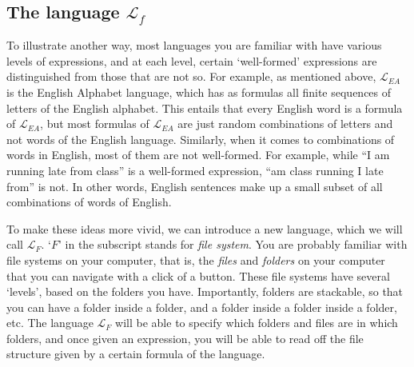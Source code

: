 \subsection{The language $\mathcal{L}_f$}

To illustrate another way, most languages you are familiar with have various levels of expressions, and at each level, certain `well-formed' expressions are distinguished from those that are not so. For example, as mentioned above, $\mathcal{L}_{EA}$ is the English Alphabet language, which has as formulas all finite sequences of letters of the English alphabet. This entails that every English word is a formula of $\mathcal{L}_{EA}$, but most formulas of $\mathcal{L}_{EA}$ are just random combinations of letters and not words of the English language. Similarly, when it comes to combinations of words in English, most of them are not well-formed. For example, while ``I am running late from class'' is a well-formed expression, ``am class running I late from'' is not. In other words, English sentences make up a small subset of all combinations of words of English. 

To make these ideas more vivid, we can introduce a new language, which we will call $\mathcal{L}_F$. `$F$' in the subscript stands for \textit{file system}. You are probably familiar with file systems on your computer, that is, the \textit{files} and \textit{folders} on your computer that you can navigate with a click of a button. These file systems have several `levels', based on the folders you have. Importantly, folders are stackable, so that you can have a folder inside a folder, and a folder inside a folder inside a folder, etc. The language $\mathcal{L}_F$ will be able to specify which folders and files are in which folders, and once given an expression, you will be able to read off the file structure given by a certain formula of the language. 


